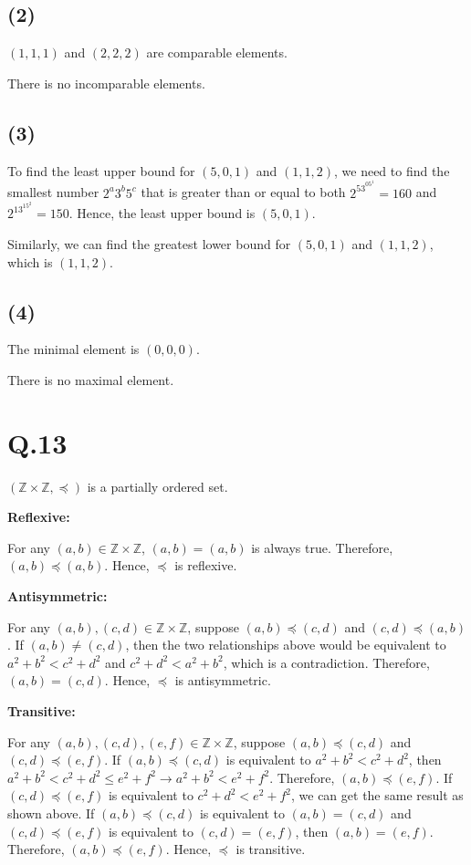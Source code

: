 \documentclass[a4paper,12pt]{article}
\begin{document}
\subsection*{(2)}

$(1,1,1)$ and $(2,2,2)$ are comparable elements.

There is no incomparable elements.

\subsection*{(3)}

To find the least upper bound for $(5,0,1)$ and $(1,1,2)$, we need to find the smallest number $2^a3^b5^c$ that is greater than or equal to both $2^53^05^1 = 160$ and $2^13^15^2 = 150$.
Hence, the least upper bound is $(5,0,1)$.

Similarly, we can find the greatest lower bound for $(5,0,1)$ and $(1,1,2)$, which is $(1,1,2)$.

\subsection*{(4)}

The minimal element is $(0,0,0)$.

There is no maximal element.

\section*{Q.13}

$(\mathbb{Z} \times \mathbb{Z}, \preceq)$ is a partially ordered set.

\textbf{Reflexive:}

For any $(a, b) \in \mathbb{Z} \times \mathbb{Z}$, $(a, b) = (a, b)$ is always true.
Therefore, $(a, b) \preceq (a, b)$.
Hence, $\preceq$ is reflexive.

\textbf{Antisymmetric:}

For any $(a, b), (c, d) \in \mathbb{Z} \times \mathbb{Z}$, suppose $(a, b) \preceq (c, d)$ and $(c, d) \preceq (a, b)$.
If $(a, b) \neq (c, d)$, then the two relationships above would be equivalent to $a^2 + b^2 < c^2 + d^2$ and $c^2 + d^2 < a^2 + b^2$, which is a contradiction.
Therefore, $(a, b) = (c, d)$.
Hence, $\preceq$ is antisymmetric.

\textbf{Transitive:}

For any $(a, b), (c, d), (e, f) \in \mathbb{Z} \times \mathbb{Z}$, suppose $(a, b) \preceq (c, d)$ and $(c, d) \preceq (e, f)$.
If $(a, b) \preceq (c, d)$ is equivalent to $a^2 + b^2 < c^2 + d^2$, then $a^2 + b^2 < c^2 + d^2 \leq e^2 + f^2 \rightarrow a^2 + b^2 < e^2 + f^2$.
Therefore, $(a, b) \preceq (e, f)$.
If $(c, d) \preceq (e, f)$ is equivalent to $c^2 + d^2 < e^2 + f^2$, we can get the same result as shown above.
If $(a, b) \preceq (c, d)$ is equivalent to $(a,b) = (c,d)$ and $(c, d) \preceq (e, f)$ is equivalent to $(c,d) = (e,f)$, then $(a,b) = (e,f)$.
Therefore, $(a, b) \preceq (e, f)$.
Hence, $\preceq$ is transitive.
\end{document}
